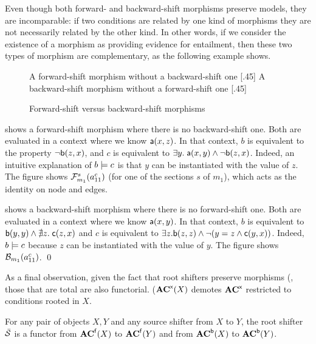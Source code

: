 \medskip\noindent
Even though both forward- and backward-shift morphisms preserve models, they are incomparable: if two conditions are related by one kind of morphisms they are not necessarily related by the other kind. In other words, if we consider the existence of a morphism as providing evidence for entailment, then these two types of morphism are complementary, as the following example shows.
%
\begin{figure}[t]
\centering
\subcaptionbox
  {A forward-shift morphism without a backward-shift one
  }
  [.45\textwidth]
  {}
  \qquad
\subcaptionbox
  {A backward-shift morphism without a forward-shift one
  }
  [.45\textwidth]
  {}
\caption{Forward-shift versus backward-shift morphisms}
\end{figure}
%
\begin{example}
 shows a forward-shift morphism where there is no backward-shift one. Both are evaluated in a context where we know $\mathsf{a}(x,z)$. In that context, $b$ is equivalent to the property $\neg \mathsf{b}(z,x)$, and $c$ is equivalent to $\exists y.\; \mathsf{a}(x,y) \wedge \neg \mathsf{b}(z,x)$. Indeed, an intuitive explanation of $b\models c$ is that $y$ can be instantiated with the value of $z$. The figure shows $\mathcal{F}_{m_1}^s(a^c_{11})$ (for one of the sections $s$ of $m_1$), which acts as the identity on node and edges.

 shows a backward-shift morphism where there is no forward-shift one. Both are evaluated in a context where we know $\mathsf{a}(x,y)$. In that context, $b$ is equivalent to $\mathsf{b}(y,y) \wedge \nexists z.\; \mathsf{c}(z,x)$ and $c$ is equivalent to $\exists z.\mathsf{b}(z,z) \wedge \neg(y=z \wedge \mathsf{c}(y,x))$.
Indeed, $b\models c$ because $z$ can be instantiated with the value of $y$. The figure shows $\mathcal{B}_{m_1}(a^c_{11})$.
\qed
\end{example}
%
As a final observation, given the fact that root shifters preserve morphisms (, those that are total are also functorial. ($\mathbf{AC}^{\mathsf x}(X)$ demotes $\mathbf{AC}^{\mathsf x}$ restricted to conditions rooted in $X$.

\begin{proposition}
For any pair of objects $X,Y$ and any source shifter from $X$ to $Y$, the root shifter $\bar{\mathcal{S}}$ is a functor from $\mathbf{AC}^{\mathsf{f}}(X)$ to $\mathbf{AC}^{\mathsf{f}}(Y)$ and from $\mathbf{AC}^{\mathsf{b}}(X)$ to $\mathbf{AC}^{\mathsf{b}}(Y)$.
\end{proposition}
